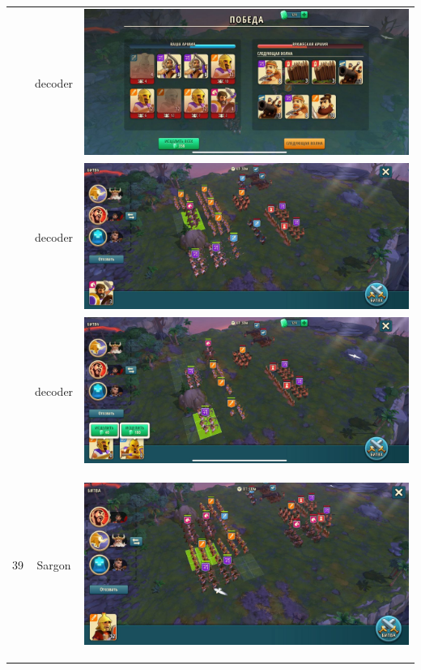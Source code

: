 \begin{longtable}{|c|c|c|}
	& decoder &
	\includegraphics[width=0.75\linewidth]{./parts/media/TreasureHunt/38/decoder/photo_2022-04-07_10-10-16.jpg} \\
	& decoder &
	\includegraphics[width=0.75\linewidth]{./parts/media/TreasureHunt/38/decoder/photo_2022-04-07_10-10-01.jpg} \\
	& decoder &
	\includegraphics[width=0.75\linewidth]{./parts/media/TreasureHunt/38/decoder/photo_2022-04-07_10-10-19.jpg} \\
	\hline
	\multirow{8}{*}{39} & Sargon &
	\hypertarget{fight39}{\includegraphics[width=0.75\linewidth]{./parts/media/TreasureHunt/39/sargon/photo_2022-04-07_13-18-09.jpg}} \\

\end{longtable}
